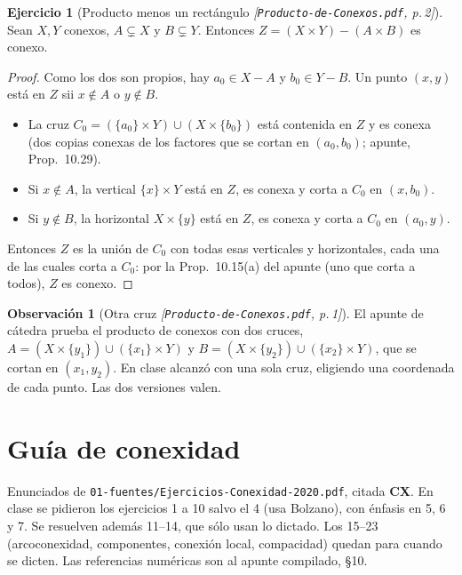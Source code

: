 \documentclass[11pt,a4paper]{article}
\newenvironment{lista}{\leavevmode\begin{itemize}[leftmargin=1.5em,itemsep=1pt,topsep=2pt,parsep=0pt]}{\end{itemize}}
\theoremstyle{definition}
\newtheorem{observacion}[definicion]{Observación}
\newtheorem{ejercicio}[definicion]{Ejercicio}
\theoremstyle{plain}
\newcommand{\fnt}[1]{{\normalfont\small\itshape\color{gray!150!black}[#1]}}
\begin{document}
\begin{ejercicio}[Producto menos un rectángulo \fnt{\texttt{Producto-de-Conexos.pdf}, p.\,2}]
Sean $X,Y$ conexos, $A\subsetneq X$ y $B\subsetneq Y$. Entonces $Z=(X\times Y)-(A\times B)$ es conexo.
\end{ejercicio}

\begin{proof}
Como los dos son propios, hay $a_0\in X-A$ y $b_0\in Y-B$. Un punto $(x,y)$ está en $Z$ sii $x\notin A$ o $y\notin B$.
\begin{lista}
\item La cruz $C_0=(\{a_0\}\times Y)\cup(X\times\{b_0\})$ está contenida en $Z$ y es conexa (dos copias conexas de los factores que se cortan en $(a_0,b_0)$; apunte, Prop.\ 10.29).
\item Si $x\notin A$, la vertical $\{x\}\times Y$ está en $Z$, es conexa y corta a $C_0$ en $(x,b_0)$.
\item Si $y\notin B$, la horizontal $X\times\{y\}$ está en $Z$, es conexa y corta a $C_0$ en $(a_0,y)$.
\end{lista}
Entonces $Z$ es la unión de $C_0$ con todas esas verticales y horizontales, cada una de las cuales corta a $C_0$: por la Prop.\ 10.15(a) del apunte (uno que corta a todos), $Z$ es conexo.
\end{proof}

\begin{observacion}[Otra cruz \fnt{\texttt{Producto-de-Conexos.pdf}, p.\,1}]
El apunte de cátedra prueba el producto de conexos con dos cruces, $A=(X\times\{y_1\})\cup(\{x_1\}\times Y)$ y $B=(X\times\{y_2\})\cup(\{x_2\}\times Y)$, que se cortan en $(x_1,y_2)$. En clase alcanzó con una sola cruz, eligiendo una coordenada de cada punto. Las dos versiones valen.
\end{observacion}

\section{Guía de conexidad}

\noindent Enunciados de \texttt{01-fuentes/Ejercicios-Conexidad-2020.pdf}, citada \textbf{CX}. En clase se pidieron los ejercicios 1 a 10 salvo el 4 (usa Bolzano), con énfasis en 5, 6 y 7. Se resuelven además 11--14, que sólo usan lo dictado. Los 15--23 (arcoconexidad, componentes, conexión local, compacidad) quedan para cuando se dicten. Las referencias numéricas son al apunte compilado, \S10.
\end{document}
